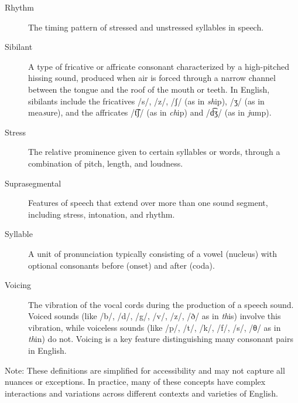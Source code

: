 \begin{description}
    \item[Rhythm] The timing pattern of stressed and unstressed syllables in speech.

    \item[Sibilant] A type of fricative or affricate consonant characterized by a high-pitched hissing sound, produced when air is forced through a narrow channel between the tongue and the roof of the mouth or teeth. In English, sibilants include the fricatives /s/, /z/, /ʃ/ (as in \textit{sh}ip), /ʒ/ (as in mea\textit{s}ure), and the affricates /t͡ʃ/ (as in \textit{ch}ip) and /d͡ʒ/ (as in \textit{j}ump).

    \item[Stress] The relative prominence given to certain syllables or words, through a combination of pitch, length, and loudness.
    
    \item[Suprasegmental] Features of speech that extend over more than one sound segment, including stress, intonation, and rhythm.
    
    \item[Syllable] A unit of pronunciation typically consisting of a vowel (nucleus) with optional consonants before (onset) and after (coda).
    
    \item[Voicing] The vibration of the vocal cords during the production of a speech sound. Voiced sounds (like /b/, /d/, /g/, /v/, /z/, /ð/ as in \textit{th}is) involve this vibration, while voiceless sounds (like /p/, /t/, /k/, /f/, /s/, /θ/ as in \textit{th}in) do not. Voicing is a key feature distinguishing many consonant pairs in English.
\end{description}

Note: These definitions are simplified for accessibility and may not capture all nuances or exceptions. In practice, many of these concepts have complex interactions and variations across different contexts and varieties of English.